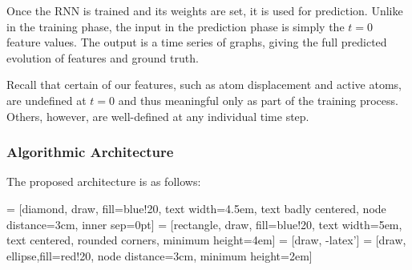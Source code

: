 Once the RNN is trained and its weights are set, it is used for prediction.  Unlike in the training phase, the input in the prediction phase is simply the $t=0$ feature values.  The output is a time series of graphs, giving the full predicted evolution of features and ground truth.

Recall that certain of our features, such as atom displacement and active atoms, are undefined at $t=0$ and thus meaningful only as part of the training process.  Others, however, are well-defined at any individual time step.

\subsubsection{Algorithmic Architecture}


The proposed architecture is as follows:

\bigskip

\begin{center}
 = [diamond, draw, fill=blue!20, 
    text width=4.5em, text badly centered, node distance=3cm, inner sep=0pt]
 = [rectangle, draw, fill=blue!20, 
    text width=5em, text centered, rounded corners, minimum height=4em]
 = [draw, -latex']
 = [draw, ellipse,fill=red!20, node distance=3cm,
    minimum height=2em]
    
\end{center}

